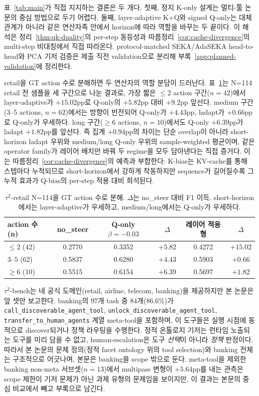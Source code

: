 표~\ref{tab:main}가 직접 지지하는 결론은 두 개다. 첫째, 정지 K-only 설계는 멀티-툴 논문의 중심 방법으로 두기 어렵다. 둘째, layer-adaptive K+Q와 signed Q-only는 대체 관계가 아니라 같은 연산자족 안에서 horizon에 따라 역할을 바꾸는 두 끝이다. 이 해석은 정리~\ref{thm:qk-duality}의 per-step 동등성과 따름정리~\ref{cor:cache-divergence}의 multi-step 비대칭에서 직접 따라온다. protocol-matched SEKA/AdaSEKA head-to-head와 PCA 기저 검증은 제출 직전 validation으로 분리해 부록~\ref{app:planned-validation}에 정리한다.

retail을 GT action 수로 분해하면 두 연산자의 역할 분담이 드러난다. 표~\ref{tab:retail-action-count}는 N=114 retail 전 샘플을 세 구간으로 나눈 결과로, 가장 짧은 $\le 2$ action 구간($n=42$)에서 layer-adaptive가 $+15.02$pp로 Q-only의 $+5.82$pp 대비 $+9.2$pp 앞선다. medium 구간($3$--$5$ actions, $n=62$)에서는 방향이 반전되어 Q-only가 $+4.43$pp, ladapt가 $+0.66$pp로 Q-only가 우세하다. long 구간($\ge 6$ actions, $n=10$)에서도 Q-only $+6.39$pp가 ladapt $+1.82$pp를 앞선다. 즉 집계 $+0.94$pp의 차이는 단순 overlap이 아니라 short-horizon ladapt 우위와 medium/long Q-only 우위의 sample-weighted 평균이며, 같은 operator family가 레이어 배치만 바꿔 두 regime을 모두 담아낸다는 직접 증거다. 이는 따름정리~\ref{cor:cache-divergence}의 예측과 부합한다: K-bias는 KV-cache를 통해 스텝마다 누적되므로 short-horizon에서 강하게 작동하지만 sequence가 길어질수록 그 누적 효과가 Q-bias의 per-step 적용 대비 희석된다.

\begin{table}[t]
\centering
\caption{$\tau^2$-retail N=114을 GT action 수로 분해. $\Delta$는 no\_steer 대비 F1 이득. short-horizon에서는 layer-adaptive가 우세하고, medium/long에서는 Q-only가 우세하다.}
\label{tab:retail-action-count}
\small
\begin{tabularx}{\linewidth}{@{}lccccc@{}}
\toprule
action 수 (n) & no\_steer & Q-only $\beta{=}{-}0.03$ & $\Delta$ & 레이어 적응형 & $\Delta$ \\
\midrule
$\le 2$ (42) & 0.2770 & 0.3352 & $+5.82$ & 0.4272 & $+15.02$ \\
$3$--$5$ (62) & 0.5837 & 0.6280 & $+4.43$ & 0.5903 & $+0.66$ \\
$\ge 6$ (10) & 0.5515 & 0.6154 & $+6.39$ & 0.5697 & $+1.82$ \\
\bottomrule
\end{tabularx}
\end{table}

$\tau^2$-bench는 네 공식 도메인(retail, airline, telecom, banking)을 제공하지만 본 논문은 앞 셋만 보고한다. banking의 $97$개 task 중 $84$개($86.6\%$)가 \texttt{call\_discoverable\_agent\_tool}, \texttt{unlock\_discoverable\_agent\_tool}, \texttt{transfer\_to\_human\_agents} 계열 meta-tool을 포함하며, 이 도구들은 실행 시점에 동적으로 discover되거나 정책 라우팅을 수행한다. 정적 온톨로지 기저는 런타임 노출되는 도구를 미리 담을 수 없고, human-escalation은 도구 \emph{선택}이 아니라 \emph{정책} 판정이다. 따라서 본 논문의 문제 정의(정적 facet ontology 위의 tool selection)와 banking 전체는 구조적으로 어긋나며, 본문은 banking을 scope 밖으로 둔다. meta-tool을 제외한 banking non-meta 서브셋($n{=}13$)에서 multipass 변형이 $+5.64$pp를 내는 관측은 scope 제한이 기저 문제가 아닌 과제 유형의 문제임을 보이지만, 이 결과는 본문의 중심 비교에서 빼고 부록으로 남긴다.

